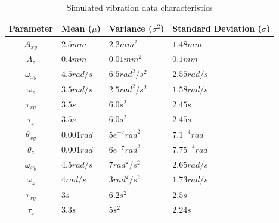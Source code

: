 \begin{table}[ht]
\centering
\begin{tabular}{ c | L | L | L }
    
     Parameter  & 
     Mean ($ \mu $) & 
     Variance ($ \sigma^{2} $) &
     Standard Deviation ($ \sigma $)\\
     \hline
     
     $ A_{xy} $ & 
     $ 2.5 mm $ & 
     $ 2.2 mm^{2} $ &
     $ 1.48 mm $ \\

      
     $ A_{z} $  & 
     $ 0.4 mm $ & 
     $ 0.01 mm^{2} $ &
     $ 0.1 mm $ \\
     
     
     $ \omega_{xy} $ & 
     $ 4.5 rad/s $ & 
     $ 6.5 rad^{2}/s^{2} $ &
     $ 2.55 rad/s $ \\
     
     
     $ \omega_{z} $& 
     $ 3.5 rad/s $ & 
     $ 2.5 rad^{2}/s^{2} $ &
     $ 1.58 rad/s $ \\

     
     $ \tau_{xy} $ & 
     $ 3.5 s $ & 
     $ 6.0 s^{2} $ &
     $ 2.45 s $ \\


     $ \tau_{z} $ & 
     $ 3.5 s $ & 
     $ 6.0 s^{2} $ &
     $ 2.45 s $ \\
    
    \hline
    \hline
    
     $ \theta_{xy} $ & 
     $ 0.001 rad $ & 
     $ 5e^{-7} rad^{2} $ &
     $ 7.1^{-4} rad $ \\

      
     $ \theta_{z} $  & 
     $ 0.001 rad $ & 
     $ 6e^{-7} rad^{2} $ &
     $ 7.75^{-4} rad $ \\
     
     
     $ \omega_{xy} $ & 
     $ 4.5 rad/s $ & 
     $ 7 rad^{2}/s^{2} $ &
     $ 2.65 rad/s $ \\

     
     $ \omega_{z} $& 
     $ 4 rad/s $ & 
     $ 3 rad^{2}/s^{2} $ &
     $ 1.73 rad/s $ \\
   
     
     $ \tau_{xy} $ & 
     $ 3 s $ & 
     $ 6.2 s^{2} $ &
     $ 2.5 s $ \\
    
     
     $ \tau_{z} $ & 
     $ 3.3 s $ & 
     $ 5 s^{2} $ &
     $ 2.24 s $ \\
     
\end{tabular}
    \caption{Simulated vibration data characteristics}
    \label{tab:sim_vib_characteristics}
\end{table} %


